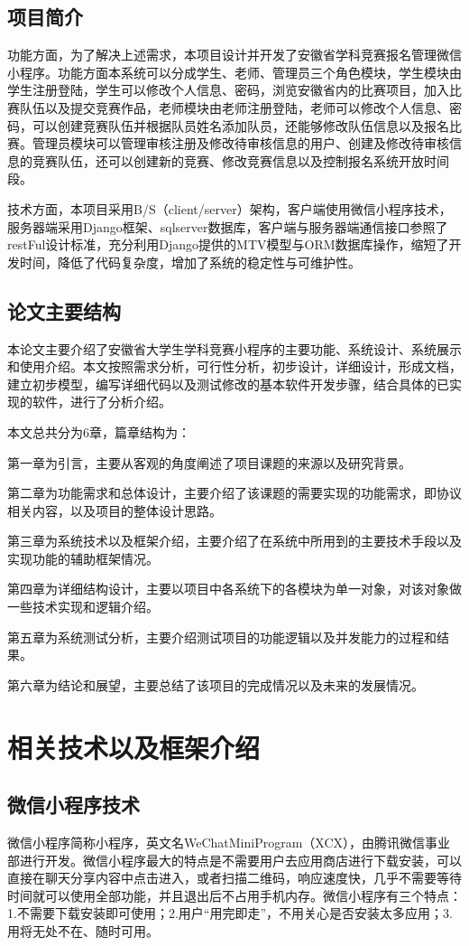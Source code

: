 \documentclass[a4paper]{ltxdoc}
\begin{document}
{		\subsection{项目简介}
		功能方面，为了解决上述需求，本项目设计并开发了安徽省学科竞赛报名管理微信小程序。功能方面本系统可以分成学生、老师、管理员三个角色模块，学生模块由学生注册登陆，学生可以修改个人信息、密码，浏览安徽省内的比赛项目，加入比赛队伍以及提交竞赛作品，老师模块由老师注册登陆，老师可以修改个人信息、密码，可以创建竞赛队伍并根据队员姓名添加队员，还能够修改队伍信息以及报名比赛。管理员模块可以管理审核注册及修改待审核信息的用户、创建及修改待审核信息的竞赛队伍，还可以创建新的竞赛、修改竞赛信息以及控制报名系统开放时间段。
		
		技术方面，本项目采用B/S（client/server）架构，客户端使用微信小程序技术，服务器端采用Django框架、sqlserver数据库，客户端与服务器端通信接口参照了restFul设计标准，充分利用Django提供的MTV模型与ORM数据库操作，缩短了开发时间，降低了代码复杂度，增加了系统的稳定性与可维护性。
		
		\subsection{论文主要结构}
		本论文主要介绍了安徽省大学生学科竞赛小程序的主要功能、系统设计、系统展示和使用介绍。本文按照需求分析，可行性分析，初步设计，详细设计，形成文档，建立初步模型，编写详细代码以及测试修改的基本软件开发步骤，结合具体的已实现的软件，进行了分析介绍。
		
		本文总共分为6章，篇章结构为：
		
		第一章为引言，主要从客观的角度阐述了项目课题的来源以及研究背景。
		
		第二章为功能需求和总体设计，主要介绍了该课题的需要实现的功能需求，即协议相关内容，以及项目的整体设计思路。
		
		第三章为系统技术以及框架介绍，主要介绍了在系统中所用到的主要技术手段以及实现功能的辅助框架情况。
		
		第四章为详细结构设计，主要以项目中各系统下的各模块为单一对象，对该对象做一些技术实现和逻辑介绍。
		
		第五章为系统测试分析，主要介绍测试项目的功能逻辑以及并发能力的过程和结果。
		
		第六章为结论和展望，主要总结了该项目的完成情况以及未来的发展情况。
		
		
		\section{相关技术以及框架介绍}
		\subsection{微信小程序技术}
		微信小程序简称小程序，英文名WeChatMiniProgram（XCX），由腾讯微信事业部进行开发。微信小程序最大的特点是不需要用户去应用商店进行下载安装，可以直接在聊天分享内容中点击进入，或者扫描二维码，响应速度快，几乎不需要等待时间就可以使用全部功能，并且退出后不占用手机内存。微信小程序有三个特点：1.不需要下载安装即可使用；2.用户“用完即走”，不用关心是否安装太多应用；3.用将无处不在、随时可用。	
		
}
\end{document}
